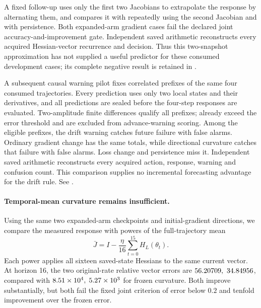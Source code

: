 \documentclass[11pt,letterpaper]{article}
\begin{document}
A fixed follow-up uses only the first two Jacobians to extrapolate the response by alternating them,
and compares it with repeatedly using the second Jacobian and with persistence. Both expanded-arm
gradient cases fail the declared joint accuracy-and-improvement gate. Independent saved arithmetic
reconstructs every acquired Hessian-vector recurrence and decision. Thus this two-snapshot approximation
has not supplied a useful predictor for these consumed development cases; its complete negative result
is retained in .

A subsequent causal warning pilot fixes \nLHRows{} correlated prefixes of the same four consumed
trajectories. Every prediction uses only two local states and their derivatives, and all predictions
are sealed before the four-step responses are evaluated. Two-amplitude finite differences qualify
all prefixes; \nLHAlready{} already exceed the error threshold and are excluded from advance-warning
scoring. Among the \nLHEligible{} eligible prefixes, the drift warning catches \nLHTrue{} future
failure with \nLHDriftFalse{} false alarms. Ordinary gradient change has the same totals, while
directional curvature catches that failure with \nLHCurvatureFalse{} false alarms. Loss change and
persistence miss it. Independent saved arithmetic reconstructs every acquired action, response,
warning and confusion count. This comparison supplies no incremental forecasting advantage for
the drift rule. See .

\paragraph{Temporal-mean curvature remains insufficient.}
Using the same two expanded-arm checkpoints and initial-gradient directions,
we compare the measured response with powers of the full-trajectory mean
\[
 \bar J=I-\frac{\eta}{16}\sum_{t=0}^{15}H_L(\theta_t).
\]
Each power applies all sixteen saved-state Hessians to the same current vector.
At horizon 16, the two original-rate relative vector errors are
$56.20709,\ 34.84956$, compared with $8.51\times10^{4},\; 5.27\times10^{3}$ for
frozen curvature. Both improve substantially, but both fail the fixed joint
criterion of error below $0.2$ and tenfold improvement over the frozen error.
\end{document}
